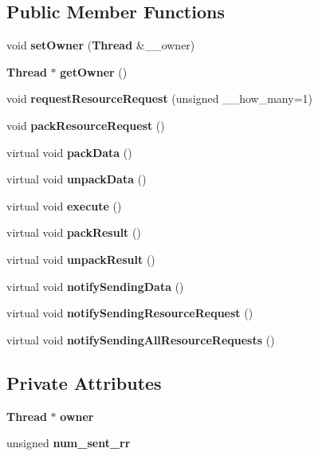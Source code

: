 \subsection*{Public Member Functions}
\begin{CompactItemize}
\item 
void {\bf set\-Owner} ({\bf Thread} \&\_\-\_\-owner)\label{class_service_33b149b98498c0e7e401b0f0839d7f0d}

\item 
{\bf Thread} $\ast$ {\bf get\-Owner} ()\label{class_service_0dae00309c51a7b7069788142aed799f}

\item 
void {\bf request\-Resource\-Request} (unsigned \_\-\_\-how\_\-many=1)\label{class_service_7e2ae35a9070a05dcd46488df649896d}

\item 
void {\bf pack\-Resource\-Request} ()\label{class_service_c4289f98d1cd9ed53e850efbb6a947bd}

\item 
virtual void {\bf pack\-Data} ()\label{class_service_aea4b8f7f8fb88e83862ee4bfd9ab207}

\item 
virtual void {\bf unpack\-Data} ()\label{class_service_3bd87b444710813d30fd754d4d0b4df3}

\item 
virtual void {\bf execute} ()\label{class_service_e4f2894e6121e60f38d41cfbd7447ae4}

\item 
virtual void {\bf pack\-Result} ()\label{class_service_e5e4f90b2315e15c2a2913bd370f4cf5}

\item 
virtual void {\bf unpack\-Result} ()\label{class_service_45c06344edbfa482b91f68e2035a6099}

\item 
virtual void {\bf notify\-Sending\-Data} ()\label{class_service_81ad4d6ebb50045b8977e2ab74826f30}

\item 
virtual void {\bf notify\-Sending\-Resource\-Request} ()\label{class_service_94e2012e76aaae3aa8199250f558d503}

\item 
virtual void {\bf notify\-Sending\-All\-Resource\-Requests} ()\label{class_service_f94cc8a5c2665d4574041737e61e9ffc}

\end{CompactItemize}
\subsection*{Private Attributes}
\begin{CompactItemize}
\item 
{\bf Thread} $\ast$ {\bf owner}\label{class_service_8b615c65c876f342fe8209eb7e36d7b2}

\item 
unsigned {\bf num\_\-sent\_\-rr}\label{class_service_a5b2ad9520bb3710b54348b99acebd58}

\end{CompactItemize}


